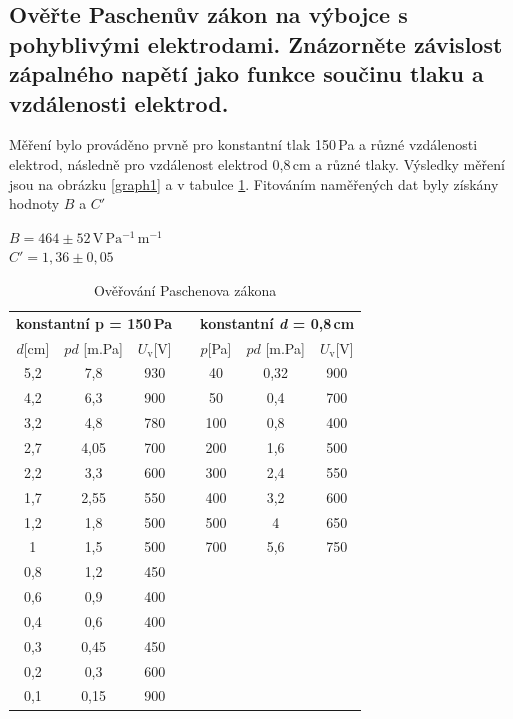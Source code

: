 \documentclass[12pt]{article}
\begin{document}
\subsection{Ověřte Paschenův zákon na výbojce s pohyblivými elektrodami. Znázorněte závislost zápalného napětí jako funkce součinu tlaku a vzdálenosti elektrod.}
Měření bylo prováděno prvně pro konstantní tlak 150\,Pa a různé vzdálenosti elektrod, následně pro vzdálenost elektrod 0,8\,cm a různé tlaky. Výsledky měření jsou na obrázku \ref{graph1} a v tabulce \ref{paschentable}. Fitováním naměřených dat byly získány hodnoty $B$ a $C'$
\begin{center}
$B = 464\pm 52\,\mathrm{V\,Pa^{-1}\,m^{-1}}$\\
$C' = 1,36 \pm 0,05 $
\end{center}

\begin{table}[htbp]
\begin{center}
\begin{tabular}{|c|c|c|c|c|c|c|}
\cline{1-3} \cline{5-7}
\multicolumn{3}{|c|}{\textbf{konstantní p = 150\,Pa}} &  & \multicolumn{3}{c|}{\textbf{konstantní \emph{d} = 0,8\,cm}} \\ \cline{1-3} \cline{5-7}
$d$[cm] & $p d$ [m.Pa]& $U_\mathrm{v}$[V] &  & $p$[Pa] & $p d$ [m.Pa] & $U_\mathrm{v}$[V] \\ \cline{1-3} \cline{5-7}
5,2 & 7,8 & 930 &  & 40 & 0,32 & 900 \\ \cline{1-3} \cline{5-7}
4,2 & 6,3 & 900 &  & 50 & 0,4 & 700 \\ \cline{1-3} \cline{5-7}
3,2 & 4,8 & 780 &  & 100 & 0,8 & 400 \\ \cline{1-3} \cline{5-7}
2,7 & 4,05 & 700 &  & 200 & 1,6 & 500 \\ \cline{1-3} \cline{5-7}
2,2 & 3,3 & 600 &  & 300 & 2,4 & 550 \\ \cline{1-3} \cline{5-7}
1,7 & 2,55 & 550 &  & 400 & 3,2 & 600 \\ \cline{1-3} \cline{5-7}
1,2 & 1,8 & 500 &  & 500 & 4 & 650 \\  \cline{1-3} \cline{5-7}
1 & 1,5 & 500 &  & 700 & 5,6 & 750 \\  \cline{1-3} \cline{5-7}
0,8 & 1,2 & 450 &  \multicolumn{4}{l}{} \\ \cline{1-3}
0,6 & 0,9 & 400 &  \multicolumn{4}{l}{} \\ \cline{1-3}
0,4 & 0,6 & 400 &   \multicolumn{4}{l}{} \\ \cline{1-3}
0,3 & 0,45 & 450 &  \multicolumn{4}{l}{} \\ \cline{1-3}
0,2 & 0,3 & 600 &  \multicolumn{4}{l}{} \\ \cline{1-3}
0,1 & 0,15 & 900 &   \multicolumn{4}{l}{} \\ \cline{1-3}
\end{tabular}
\caption{Ověřování Paschenova zákona}
\label{paschentable}
\end{center}
\end{table}
\end{document}
